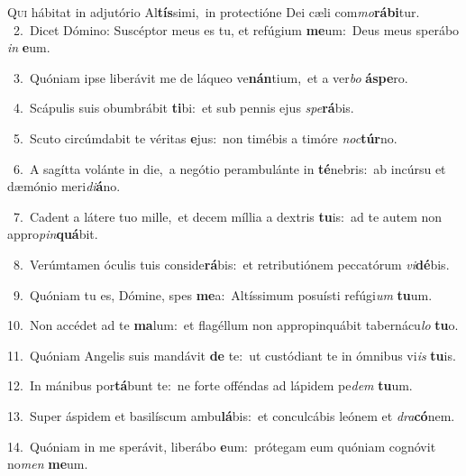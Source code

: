 \lettrine{\initial\textcolor{\initialcolor}{Q}}{ui} hábitat in adjutório Al\-\textbf{tís}\-simi,~\star in protectióne Dei cæli com\-\textit{mo}\-\textbf{rá}\textbf{bi}tur.\\
{\numbfont\textcolor{\numbcolor}{~2.}}~Dicet Dómino: Suscéptor meus es tu, et refúgium \textbf{me}\-um:~\star Deus meus sperábo \textit{in} \textbf{e}\-um.\par
{\numbfont\textcolor{\numbcolor}{~3.}}~Quóniam ipse liberávit me de láqueo ve\-\textbf{nán}\-tium,~\star et a ver\textit{bo} \textbf{ás}\-\textbf{pe}ro.\par
{\numbfont\textcolor{\numbcolor}{~4.}}~Scápulis suis obumbrábit \textbf{ti}\-bi:~\star et sub pennis ejus \textit{spe}\-\textbf{rá}bis.\par
{\numbfont\textcolor{\numbcolor}{~5.}}~Scuto circúmdabit te véritas \textbf{e}\-jus:~\star non timébis a timóre \textit{noc}\-\textbf{túr}no.\par
{\numbfont\textcolor{\numbcolor}{~6.}}~A sagítta volánte in die,~\dagger a negótio perambulánte in \textbf{té}\-nebris:~\star ab incúrsu et dæmónio meri\-\textit{di}\-\textbf{á}no.\par
{\numbfont\textcolor{\numbcolor}{~7.}}~Cadent a látere tuo mille,~\dagger et decem míllia a dextris \textbf{tu}\-is:~\star ad te autem non appro\-\textit{pin}\-\textbf{quá}bit.\par
{\numbfont\textcolor{\numbcolor}{~8.}}~Verúmtamen óculis tuis conside\-\textbf{rá}\-bis:~\star et retributiónem peccatórum \textit{vi}\-\textbf{dé}bis.\par
{\numbfont\textcolor{\numbcolor}{~9.}}~Quóniam tu es, Dómine, spes \textbf{me}\-a:~\star Altíssimum posuísti refúgi\textit{um} \textbf{tu}\-um.\par
{\numbfont\textcolor{\numbcolor}{10.}}~Non accédet ad te \textbf{ma}\-lum:~\star et flagéllum non appropinquábit tabernácu\textit{lo} \textbf{tu}\-o.\par
{\numbfont\textcolor{\numbcolor}{11.}}~Quóniam Angelis suis mandávit \textbf{de} te:~\star ut custódiant te in ómnibus vi\textit{is} \textbf{tu}\-is.\par
{\numbfont\textcolor{\numbcolor}{12.}}~In mánibus por\-\textbf{tá}\-bunt te:~\star ne forte offéndas ad lápidem pe\textit{dem} \textbf{tu}\-um.\par
{\numbfont\textcolor{\numbcolor}{13.}}~Super áspidem et basilíscum ambu\-\textbf{lá}\-bis:~\star et conculcábis leónem et \textit{dra}\-\textbf{có}nem.\par
{\numbfont\textcolor{\numbcolor}{14.}}~Quóniam in me sperávit, liberábo \textbf{e}\-um:~\star prótegam eum quóniam cognóvit no\textit{men} \textbf{me}\-um.\par
